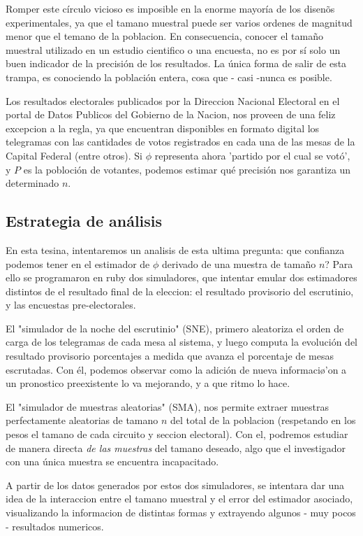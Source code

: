 \documentclass[12pt, a4paper]{article}
\begin{document}
Romper este c\'irculo vicioso es imposible en la enorme mayor\'ia de los disen\~os experimentales, ya que el tamano muestral puede ser varios ordenes de magnitud menor que el temano de la poblacion. En consecuencia, conocer el tama\~no muestral utilizado en un estudio cientifico o una encuesta, no es por s\'i solo un buen indicador de la precisi\'on de los resultados. La \'unica forma de salir de esta trampa, es conociendo la poblaci\'on entera, cosa que - casi -nunca es posible.

Los resultados electorales publicados por la Direccion Nacional Electoral en el portal de Datos Publicos del Gobierno de la Nacion, nos proveen de una feliz excepcion a la regla, ya que encuentran disponibles en formato digital los telegramas con las cantidades de votos registrados en cada una de las mesas de la Capital Federal (entre otros). Si $\phi$ representa ahora 'partido por el cual se vot\'o', y $P$ es la pobloci\'on de votantes, podemos estimar qu\'e precisi\'on nos garantiza un determinado $n$.

\subsection{Estrategia de an\'alisis}
En esta tesina, intentaremos un analisis de esta ultima pregunta: que confianza podemos tener en el estimador de $\phi$ derivado de una muestra de tama\~no $n$? Para ello se programaron en ruby dos simuladores, que intentar emular dos estimadores distintos de el resultado final de la eleccion: el resultado provisorio del escrutinio, y las encuestas pre-electorales.


El "simulador de la noche del escrutinio" (SNE), primero aleatoriza el orden de carga de los telegramas de cada mesa al sistema, y luego computa la evoluci\'on del resultado provisorio porcentajes a medida que avanza el porcentaje de mesas escrutadas. Con \'el, podemos observar como la adici\'on de nueva informaci\o'on a un pronostico preexistente lo va mejorando, y a que ritmo lo hace.

El "simulador de muestras aleatorias" (SMA), nos permite extraer muestras perfectamente aleatorias de tamano $n$ del total de la poblacion (respetando en los pesos el tamano de cada circuito y seccion electoral). Con el, podremos estudiar de manera directa \emph{de las muestras} del tamano deseado, algo que el investigador con una \'unica muestra se encuentra incapacitado.

A partir de los datos generados por estos dos simuladores, se intentara dar una idea de la interaccion entre el tamano muestral y el error del estimador asociado, visualizando la informacion de distintas formas y extrayendo algunos - muy pocos - resultados numericos.
\end{document}
